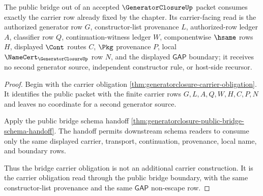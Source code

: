 \begin{theorem}
\label{thm:generatorclosure-bridge-carrier-obligation}
The public bridge out of an accepted $\GeneratorClosureUp$ packet consumes exactly the carrier row already fixed by the chapter. Its carrier-facing read is the authorized generator row $G$, constructor-list provenance $L$, authorized-row ledger $A$, classifier row $Q$, continuation-witness ledger $W$, componentwise $\hsame$ rows $H$, displayed $\Cont$ routes $C$, $\Pkg$ provenance $P$, local $\NameCert_{\GeneratorClosureUp}$ row $N$, and the displayed $\mathsf{GAP}$ boundary; it receives no second generator source, independent constructor rule, or host-side recursor.
\end{theorem}
\begin{proof}
Begin with the carrier obligation \autoref{thm:generatorclosure-carrier-obligation}. It identifies the public packet with the finite carrier rows $G,L,A,Q,W,H,C,P,N$ and leaves no coordinate for a second generator source.

Apply the public bridge schema handoff \autoref{thm:generatorclosure-public-bridge-schema-handoff}. The handoff permits downstream schema readers to consume only the same displayed carrier, transport, continuation, provenance, local name, and boundary rows.

Thus the bridge carrier obligation is not an additional carrier construction. It is the carrier obligation read through the public bridge boundary, with the same constructor-list provenance and the same $\mathsf{GAP}$ non-escape row.
\end{proof}

